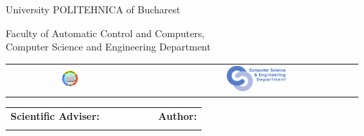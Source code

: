 \begin{titlepage}
	\begin{center}
		{\Large University POLITEHNICA of Bucharest}
		\par\vspace*{2mm}
		{\Large Faculty of Automatic Control and Computers,\\
		Computer Science and Engineering Department}
		\par\vspace*{3mm}
		\begin{table}[h]
			\begin{center}
				\begin{tabular}{cccc}
					\includegraphics[width=0.13\textwidth]{src/img/branding/upb}
					& & &
					\includegraphics[width=0.30\textwidth]{src/img/branding/cs}
				\end{tabular}
			\end{center}
		\end{table}
		
		\VARtitlespacing
		\VARthesiscaption
		\par\vspace*{15mm}
		{\Huge \VARtitleen}
		\VARtitlespacing

		\begin{table}[h]
			\begin{center}
				\begin{tabular}{lcccccl}
					\Large \textbf{\Large Scientific Adviser:}
					\vspace*{1mm} &&&&&& \Large \textbf{\Large Author:}\vspace*{1mm} \\
					\Large \VARadviser &&&&&& \Large \VARauthor
				\end{tabular}
			\end{center}
		\end{table}

		\par\vspace*{30mm}
		\Large \VARtitlefooteren
	\end{center}
\end{titlepage}

